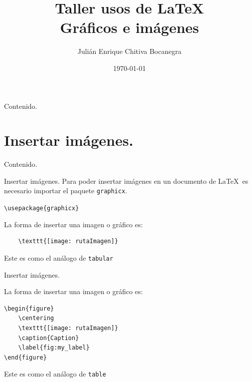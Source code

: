 \documentclass[dvipsnames,xcolor=x11names]{beamer}
\title{Taller usos de \LaTeX \\ \small{Gráficos e imágenes} \vspace*{-0.2cm}}
\author[Julián Chitiva Bocanegra]{Julián Enrique Chitiva Bocanegra}
\institute[Uniandes] 
{Universidad de los Andes\\ Facultad de Economía}
\date{\today}
\theoremstyle{plain}
\theoremstyle{definition}
\begin{document}
\begin{frame}
  \titlepage
\end{frame}
\begin{frame}{Contenido.}
  \tableofcontents
\end{frame}

\section{Insertar imágenes.}
\begin{frame}{Contenido.}
  \tableofcontents[currentsection]
\end{frame}
\begin{frame}[fragile]{Insertar imágenes.}
Para poder insertar imágenes en un documento de \LaTeX\ es necesario importar el paquete \verb!graphicx!.

\verb!\usepackage{graphicx}! \pause

La forma de insertar una imagen o gráfico es:

\begin{verbatim}
    \texttt{[image: rutaImagen]}
\end{verbatim}

Este es como el análogo de \verb!tabular!
    
\end{frame}

\begin{frame}[fragile]{Insertar imágenes.}

La forma de insertar una imagen o gráfico es:

\begin{verbatim}
\begin{figure}
    \centering
    \texttt{[image: rutaImagen]}
    \caption{Caption}
    \label{fig:my_label}
\end{figure}
\end{verbatim}

Este es como el análogo de \verb!table!
    
\end{frame}
\end{document}
